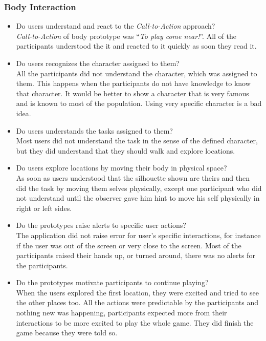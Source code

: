 \subsubsection{Body Interaction}
\begin{itemize}
\item Do users understand and react to the \emph{Call-to-Action} approach? \\
\emph{Call-to-Action} of body prototype was ``\emph{To play come near!}''. All of the participants understood the it and reacted to it quickly as soon they read it.

\item Do users recognizes the character assigned to them?\\ 
All the participants did not understand the character, which was assigned to them. This happens when the participants do not have knowledge to know that character. It would be better to show a character that is very famous and is known to most of the population. Using very specific character is a bad idea. 

\item  Do users understands the tasks assigned to them?\\ 
Most users did not understand the task in the sense of the defined character, but they did understand that they should walk and explore locations.

\item Do users explore locations by moving their body in physical space? \\ 
As soon as users understood that the silhouette shown are theirs and then did the task by moving them selves physically, except one participant who did not understand until the observer gave him hint to move his self physically in right or left sides.

\item Do the prototypes raise alerts to specific user actions?   \\ 
The application did not raise error for user's specific interactions, for instance if the user was out of the screen or very close to the screen. Most of the participants raised their hands up, or turned around, there was no alerts for the participants.

\item Do the prototypes motivate participants to continue playing?\\ 
When the users explored the first location, they were excited and tried to see the other places too. All the actions were predictable by the participants and nothing new was happening, participants expected more from their interactions to be more excited to play the whole game. They did finish the game because they were told so.


\end{itemize}


